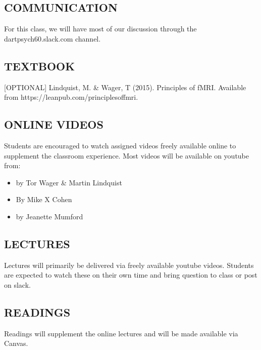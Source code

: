 \documentclass[letterpaper,10pt,english]{sphinxmanual}
\begin{document}
\subsection{COMMUNICATION}
\label{\detokenize{content/Syllabus:communication}}
For this class, we will have most of our discussion through the dart\sphinxhyphen{}psych60.slack.com channel.


\subsection{TEXTBOOK}
\label{\detokenize{content/Syllabus:textbook}}
{[}OPTIONAL{]} Lindquist, M. \& Wager, T (2015). Principles of fMRI. Available from https://leanpub.com/principlesoffmri.


\subsection{ONLINE VIDEOS}
\label{\detokenize{content/Syllabus:online-videos}}
Students are encouraged to watch assigned videos freely available online to supplement the classroom experience.  Most videos will be available on youtube from:
\begin{itemize}
\item {} 
 by Tor Wager \& Martin Lindquist

\item {} 
 By Mike X Cohen

\item {} 
 by Jeanette Mumford

\end{itemize}


\subsection{LECTURES}
\label{\detokenize{content/Syllabus:lectures}}
Lectures will primarily be delivered via freely available youtube videos. Students are expected to watch these on their own time and bring question to class or post on slack.


\subsection{READINGS}
\label{\detokenize{content/Syllabus:readings}}
Readings will supplement the online lectures and will be made available via Canvas.
\end{document}
